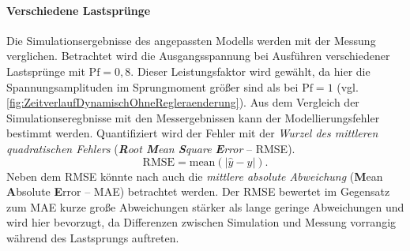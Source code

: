 \paragraph{Verschiedene Lastsprünge}
Die Simulationsergebnisse des angepassten Modells werden mit der Messung verglichen. Betrachtet wird die Ausgangsspannung bei Ausführen verschiedener Lastsprünge mit $\mathrm{Pf}=0,8$. Dieser Leistungsfaktor wird gewählt, da hier die Spannungsamplituden im Sprungmoment größer sind als bei $\mathrm{Pf}=1$ (vgl. \cref{fig:ZeitverlaufDynamischOhneRegleraenderung}). Aus dem Vergleich der Simulationseregbnisse mit den Messergebnissen kann der Modellierungsfehler bestimmt werden. Quantifiziert wird der Fehler mit der \emph{Wurzel des mittleren quadratischen Fehlers} (\emph{\textbf{R}oot \textbf{M}ean \textbf{S}quare \textbf{E}rror} -- RMSE). \begin{equation}
\mathrm{RMSE} = \mathrm{mean}\left(\left| \hat{y} - y \right|\right).
\end{equation}
Neben dem RMSE könnte nach \cite{pontiusComponentsInformationMultiple2008} auch die \emph{mittlere absolute Abweichung} (\textbf{M}ean \textbf{A}bsolute \textbf{E}rror -- MAE) betrachtet werden. Der RMSE bewertet im Gegensatz zum MAE kurze große Abweichungen stärker als lange geringe Abweichungen und wird hier bevorzugt, da Differenzen zwischen Simulation und Messung vorrangig während des Lastsprungs auftreten.

